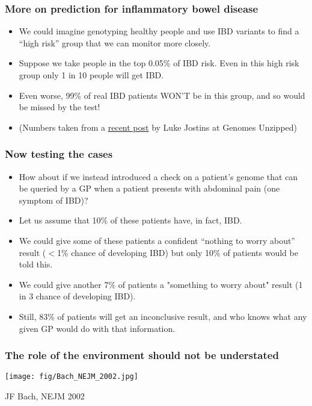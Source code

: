 \documentclass{beamer}
\begin{document}
\begin{frame}
  \frametitle{More on prediction for inflammatory bowel disease}
  \begin{itemize} 
  \item We could imagine genotyping healthy people and use IBD variants to find a “high risk” group that we can monitor more closely.
  \item Suppose we take people in the top 0.05\% of IBD risk. Even in this high risk group only 1 in 10 people will get IBD.
  \item Even worse, 99\% of real IBD patients WON’T be in this group, and so would be missed by the test!
  \item (Numbers taken from a \href{http://www.genomesunzipped.org/2012/11/dozens-of-new-ibd-genes-but-can-they-predict-disease.php\#more-5226}{recent post} by Luke Jostins at Genomes Unzipped)
  \end{itemize}
\end{frame}


\begin{frame}
  \frametitle{Now testing the cases}
  \begin{itemize} 
  \item How about if we instead introduced a check on a patient’s genome that can be queried by a GP when a patient presents with abdominal pain (one symptom of IBD)?
  \item Let us assume that 10\% of these patients have, in fact, IBD.
  \item We could give some of these patients a confident “nothing to worry about” result ($<$1\% chance of developing IBD) but only 10\% of patients would be told this.
  \item We could give another 7\% of patients a "something to worry about" result (1 in 3 chance of developing IBD).
  \item Still, 83\% of patients will get an inconclusive result, and who knows what any given GP would do with that information.
  \end{itemize}
\end{frame}


\begin{frame}
  \frametitle{The role of the environment should not be understated}
  \begin{center} 
    \texttt{[image: fig/Bach\_NEJM\_2002.jpg]}
  \end{center}
  JF Bach, NEJM 2002
\end{frame}
\end{document}
